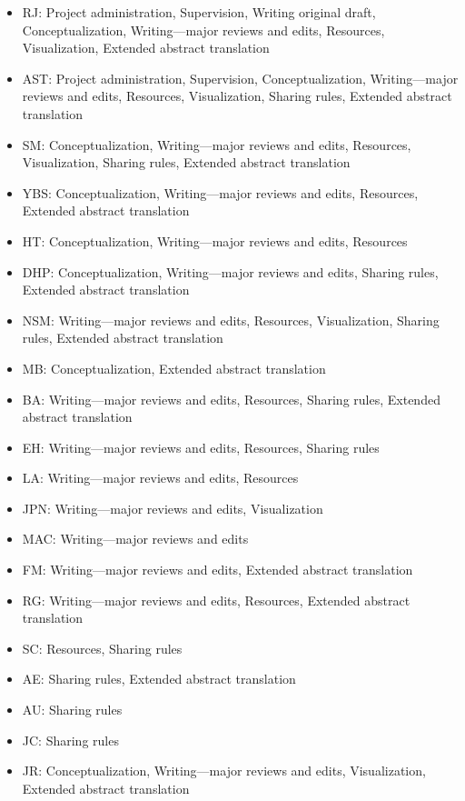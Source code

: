 \documentclass[10pt,letterpaper]{article}
\begin{document}
\begin{itemize}
    \item RJ: Project administration, Supervision, Writing original draft, Conceptualization, Writing---major reviews and edits, Resources, Visualization, Extended abstract translation
    \item AST: Project administration, Supervision, Conceptualization,  Writing---major reviews and edits, Resources, Visualization, Sharing rules, Extended abstract translation
    \item SM: Conceptualization, Writing---major reviews and edits, Resources, Visualization, Sharing rules, Extended abstract translation
    \item YBS: Conceptualization, Writing---major reviews and edits, Resources, Extended abstract translation
    \item HT: Conceptualization, Writing---major reviews and edits, Resources
    \item DHP: Conceptualization, Writing---major reviews and edits, Sharing rules, Extended abstract translation
    \item NSM: Writing---major reviews and edits, Resources, Visualization, Sharing rules, Extended abstract translation
    \item MB: Conceptualization, Extended abstract translation
    \item BA: Writing---major reviews and edits, Resources, Sharing rules, Extended abstract translation
    \item EH: Writing---major reviews and edits, Resources, Sharing rules
    \item LA: Writing---major reviews and edits, Resources
    \item JPN: Writing---major reviews and edits, Visualization
    \item MAC: Writing---major reviews and edits
    \item FM: Writing---major reviews and edits, Extended abstract translation
    \item RG: Writing---major reviews and edits, Resources, Extended abstract translation
    \item SC: Resources, Sharing rules
    \item AE: Sharing rules, Extended abstract translation
    \item AU: Sharing rules
    \item JC: Sharing rules
    \item JR: Conceptualization, Writing---major reviews and edits, Visualization, Extended abstract translation
\end{itemize}
\end{document}
